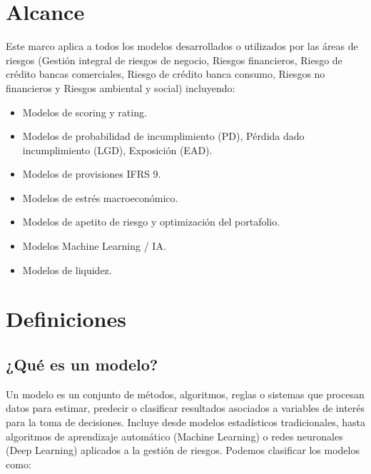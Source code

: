 \documentclass[11pt,oneside]{article}%
\begin{document}
\section{Alcance} 

Este marco aplica a todos los modelos desarrollados o utilizados por las áreas de riesgos (Gestión integral de riesgos de negocio, Riesgos financieros, Riesgo de crédito bancas comerciales, Riesgo de crédito banca consumo, Riesgos no financieros y Riesgos ambiental y social) incluyendo: 
\begin{itemize}
\item Modelos de scoring y rating. 
\item Modelos de probabilidad de incumplimiento  (PD), Pérdida dado incumplimiento (LGD), Exposición (EAD). 
\item Modelos de provisiones IFRS 9.
\item Modelos de estrés macroeconómico.
\item Modelos de apetito de riesgo y optimización del portafolio. 
\item Modelos Machine Learning / IA. 
\item Modelos de liquidez.
\end{itemize} 

\section{Definiciones}
\subsection{¿Qué es un modelo?}
Un modelo es un conjunto de métodos, algoritmos, reglas o sistemas que procesan datos para estimar, predecir o clasificar resultados asociados a variables de interés para la toma de decisiones. Incluye desde modelos estadísticos tradicionales, hasta algoritmos de aprendizaje automático (Machine Learning) o redes neuronales (Deep Learning) aplicados a la gestión de riesgos.  Podemos clasificar los modelos como:
\end{document}
